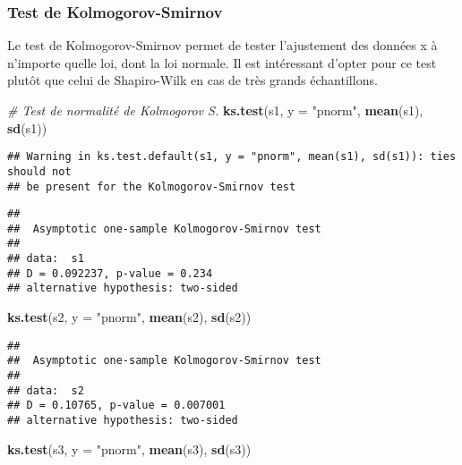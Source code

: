 \documentclass[
]{book}
\newenvironment{Shaded}{\begin{snugshade}}{\end{snugshade}}
\newcommand{\AttributeTok}[1]{\textcolor[rgb]{0.13,0.29,0.53}{#1}}
\newcommand{\CommentTok}[1]{\textcolor[rgb]{0.56,0.35,0.01}{\textit{#1}}}
\newcommand{\FunctionTok}[1]{\textcolor[rgb]{0.13,0.29,0.53}{\textbf{#1}}}
\newcommand{\NormalTok}[1]{#1}
\newcommand{\StringTok}[1]{\textcolor[rgb]{0.31,0.60,0.02}{#1}}
\theoremstyle{definition}
\theoremstyle{definition}
\theoremstyle{definition}
\theoremstyle{definition}
\theoremstyle{remark}
\begin{document}
\hypertarget{test-de-kolmogorov-smirnov}{%
\subsubsection{Test de Kolmogorov-Smirnov}\label{test-de-kolmogorov-smirnov}}

Le test de Kolmogorov-Smirnov permet de tester l'ajustement des données x à n'importe quelle loi, dont la loi normale. Il est intéressant d'opter pour ce test plutôt que celui de Shapiro-Wilk en cas de très grands échantillons.

\begin{Shaded}
\begin{Highlighting}[]
\CommentTok{\# Test de normalité de Kolmogorov S.}
\FunctionTok{ks.test}\NormalTok{(s1, }\AttributeTok{y =} \StringTok{"pnorm"}\NormalTok{, }\FunctionTok{mean}\NormalTok{(s1), }\FunctionTok{sd}\NormalTok{(s1))}
\end{Highlighting}
\end{Shaded}

\begin{verbatim}
## Warning in ks.test.default(s1, y = "pnorm", mean(s1), sd(s1)): ties should not
## be present for the Kolmogorov-Smirnov test
\end{verbatim}

\begin{verbatim}
## 
##  Asymptotic one-sample Kolmogorov-Smirnov test
## 
## data:  s1
## D = 0.092237, p-value = 0.234
## alternative hypothesis: two-sided
\end{verbatim}

\begin{Shaded}
\begin{Highlighting}[]
\FunctionTok{ks.test}\NormalTok{(s2, }\AttributeTok{y =} \StringTok{"pnorm"}\NormalTok{, }\FunctionTok{mean}\NormalTok{(s2), }\FunctionTok{sd}\NormalTok{(s2))}
\end{Highlighting}
\end{Shaded}

\begin{verbatim}
## 
##  Asymptotic one-sample Kolmogorov-Smirnov test
## 
## data:  s2
## D = 0.10765, p-value = 0.007001
## alternative hypothesis: two-sided
\end{verbatim}

\begin{Shaded}
\begin{Highlighting}[]
\FunctionTok{ks.test}\NormalTok{(s3, }\AttributeTok{y =} \StringTok{"pnorm"}\NormalTok{, }\FunctionTok{mean}\NormalTok{(s3), }\FunctionTok{sd}\NormalTok{(s3))}
\end{Highlighting}
\end{Shaded}
\end{document}
